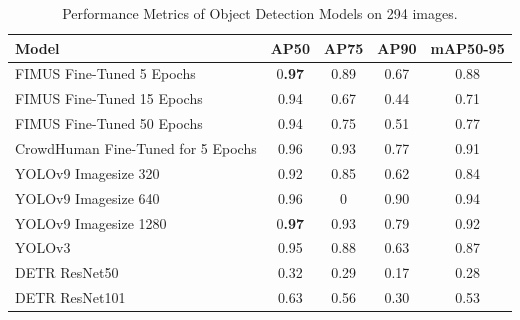 \begin{table}[H]
    \centering
    \renewcommand{\arraystretch}{1.5} %
    \setlength{\tabcolsep}{1em}
    \begin{tabular}{|l|c|c|c|c|}
        \hline
        \rowcolor{gray!25}
        \textbf{Model} & \textbf{AP50} & \textbf{AP75} & \textbf{AP90} & \textbf{mAP50-95} \\ \hline
		FIMUS Fine-Tuned 5 Epochs              & 0\textbf{.97} & 0.89 & 0.67 & 0.88 \\ \hline
		FIMUS Fine-Tuned 15 Epochs             & 0.94 & 0.67 & 0.44 & 0.71 \\ \hline
		FIMUS Fine-Tuned 50 Epochs             & 0.94 & 0.75 & 0.51 & 0.77 \\ \hline
		CrowdHuman Fine-Tuned for 5 Epochs	   & 0.96 & 0.93 & 0.77 & 0.91 \\ \hline
		YOLOv9 Imagesize 320 		           & 0.92 & 0.85 & 0.62 & 0.84 \\ \hline
		YOLOv9 Imagesize 640 		           & 0.96 & 0\textbf{.93 & 0.90 & 0.94 }\\ \hline
		YOLOv9 Imagesize 1280		           & 0\textbf{.97} & 0.93 & 0.79 & 0.92 \\ \hline
		YOLOv3 							       & 0.95 & 0.88 & 0.63 & 0.87 \\ \hline
		DETR ResNet50					   	   & 0.32 & 0.29 & 0.17 & 0.28 \\ \hline	
		DETR ResNet101					       & 0.63 & 0.56 & 0.30 & 0.53 \\ \hline 
    \end{tabular}
    \caption{\centering Performance Metrics of Object Detection Models on 294 images.}
    \label{tab:performance_metrics}
\end{table}




